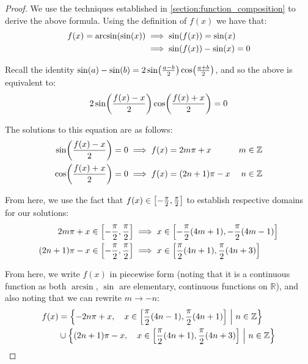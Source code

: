 \begin{proof}
    We use the techniques established in \ref{section:function_composition} to derive the above formula. Using the definition of $f(x)$ we have that:
    \begin{align*}
        f(x)=\arcsin\paren{\sin\paren{x}} &\implies \sin\paren{f(x)}=\sin\paren{x} \\
        &\implies \sin\paren{f(x)}-\sin\paren{x}=0
    \end{align*}

    Recall the identity $\sin\paren{a}-\sin\paren{b}=2\sin\paren*{\frac{a-b}{2}}\cos\paren*{\frac{a+b}{2}}$, and so the above is equivalent to:
    $$
        2\sin\paren*{\frac{f(x)-x}{2}}\cos\paren*{\frac{f(x)+x}{2}}=0
    $$

    The solutions to this equation are as follows\footnotemark:
    \begin{align}
        \sin\paren*{\frac{f(x)-x}{2}}=0 &\implies f(x)=2m\pi+x & m\in\mathbb{Z} \\
        \cos\paren*{\frac{f(x)+x}{2}}=0 &\implies f(x)=(2n+1)\pi-x & n\in\mathbb{Z}
    \end{align}


    From here, we use the fact that $f(x)\in\brak*{-\frac{\pi}{2},\frac{\pi}{2}}$ to establish respective domains for our solutions:
    \begin{align}
        2m\pi+x\in\brak*{-\frac{\pi}{2},\frac{\pi}{2}} &\implies x\in\brak*{-\frac{\pi}{2}(4m+1),-\frac{\pi}{2}(4m-1)} \\
        (2n+1)\pi-x\in\brak*{-\frac{\pi}{2},\frac{\pi}{2}} &\implies x\in\brak*{\frac{\pi}{2}(4n+1),\frac{\pi}{2}(4n+3)}
    \end{align}

    From here, we write $f(x)$ in piecewise form (noting that it is a continuous function as both $\arcsin$, $\sin$ are elementary, continuous functions on $\mathbb{R}$), and also noting that we can rewrite $m\to-n$:
    \begin{align*}
        f(x) &= \pwobj{-2n\pi+x}{x\in\brak*{\frac{\pi}{2}(4n-1),\frac{\pi}{2}(4n+1)}}{n\in\mathbb{Z}} \\
             &\cup \pwobj{(2n+1)\pi-x}{x\in\brak*{\frac{\pi}{2}(4n+1),\frac{\pi}{2}(4n+3)}}{n\in\mathbb{Z}}
    \end{align*}
\end{proof}

\newpage